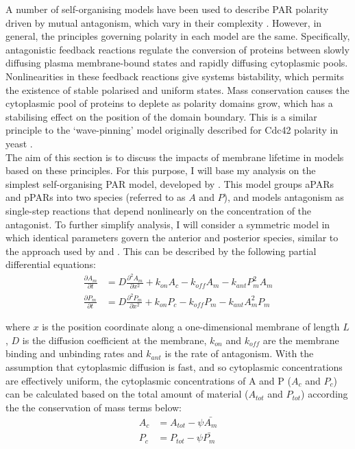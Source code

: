\documentclass[12pt]{"report"}
\begin{document}
A number of self-organising models have been used to describe PAR polarity driven by mutual antagonism, which vary in their complexity \citep{Goehring2011a, Dawes2011, Sailer2015, Arata2016, Gross2018}. However, in general, the principles governing polarity in each model are the same. Specifically, antagonistic feedback reactions regulate the conversion of proteins between slowly diffusing plasma membrane-bound states and rapidly diffusing cytoplasmic pools. Nonlinearities in these feedback reactions give systems bistability, which permits the existence of stable polarised and uniform states. Mass conservation causes the cytoplasmic pool of proteins to deplete as polarity domains grow, which has a stabilising effect on the position of the domain boundary. This is a similar principle to the `wave-pinning' model originally described for Cdc42 polarity in yeast \citep{Mori2008}.\\

The aim of this section is to discuss the impacts of membrane lifetime in models based on these principles. For this purpose, I will base my analysis on the simplest self-organising PAR model, developed by \textcite{Goehring2011a}. This model groups aPARs and pPARs into two species (referred to as $A$ and $P$), and models antagonism as single-step reactions that depend nonlinearly on the concentration of the antagonist. To further simplify analysis, I will consider a symmetric model in which identical parameters govern the anterior and posterior species, similar to the approach used by \textcite{Hubatsch2019a} and \textcite{Trong2014}. This can be described by the following partial differential equations:
\begin{align}
\frac{\partial A_m}{\partial t} &= D \frac{\partial^2 A_m}{\partial x^2} + k_{on} A_c - k_{off} A_m - k_{ant} P_m^2 A_m\\
\frac{\partial P_m}{\partial t} &= D \frac{\partial^2 P_m}{\partial x^2} + k_{on} P_c - k_{off} P_m - k_{ant} A_m^2 P_m
\end{align}

where $x$ is the position coordinate along a one-dimensional membrane of length $L$, $D$ is the diffusion coefficient at the membrane, $k_{on}$ and $k_{off}$ are the membrane binding and unbinding rates and $k_{ant}$ is the rate of antagonism. With the assumption that cytoplasmic diffusion is fast, and so cytoplasmic concentrations are effectively uniform, the cytoplasmic concentrations of A and P ($A_c$ and $P_c$) can be calculated based on the total amount of material ($A_{tot}$ and $P_{tot}$) according the the conservation of mass terms below:
\begin{align}
A_c &= A_{tot} - \psi \bar{A_m}\\
P_c &= P_{tot} - \psi \bar{P_m}
\end{align}
\end{document}
